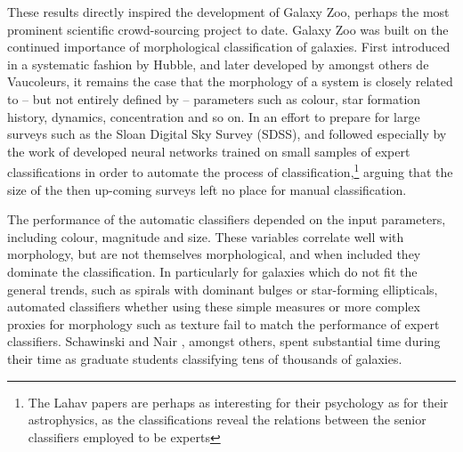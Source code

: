 \documentclass{ar2e}
\begin{document}

  These results directly inspired
the development of Galaxy Zoo, perhaps the most prominent scientific
crowd-sourcing project to date. Galaxy Zoo was built on the continued
importance of morphological classification of galaxies. First introduced in a
systematic fashion by Hubble, and later developed by amongst others de
Vaucoleurs, it remains the case that the morphology of a system is closely
related to -- but not entirely defined by -- parameters such as colour, star
formation history, dynamics, concentration and so on.  In an effort to prepare
for large surveys such as the Sloan Digital Sky Survey (SDSS),
\citet{Lahav1995} and \citet{Lahav1996} followed especially by the work of
\citet{Ball} developed neural networks trained on small samples of expert
classifications in order to automate the process of
classification,\footnote{The Lahav papers are perhaps as interesting for their
psychology as for their astrophysics, as the classifications reveal the
relations between the senior classifiers employed to be experts} arguing that
the size of the then up-coming surveys left no place for manual
classification.


The performance of the automatic classifiers depended on the input parameters,
including colour, magnitude and size. These variables correlate well with
morphology, but are not themselves morphological, and when included they
dominate the classification. In particularly for galaxies which do not fit the
general trends, such as spirals with dominant bulges or star-forming
ellipticals, automated classifiers whether using these simple measures or more
complex proxies for morphology such as texture fail to match the performance
of expert classifiers. Schawinski \citep{Scha2007} and Nair \citep{Nair}, amongst others, spent substantial
time during their time as graduate students classifying tens of thousands of
galaxies. 
\end{document}
